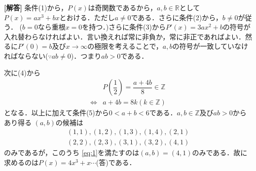\documentclass[../../main.tex]{subfiles}
\begin{document}
\begin{oframed}
  
\end{oframed}

{\bf [解答]} 条件(1)から，$P(x)$は奇関数であるから，$a,b\in\mathbb{R}$として
$P(x)=ax^3+bx$とおける．ただし$a\not=0$である．さらに条件(2)から，$b\not=0$が従う．
($b=0$なら重根$x=0$を持つ．)さらに条件(3)から$P'(x)=3ax^2+b$の符号が入れ替わらなければよい．言い換えれば常に非負か，常に非正であればよい．然るに$P'(0)=b$及び$x\to\infty$の極限を考えることで，$a,b$の符号が一致していなければならない($\because ab\not=0$)．つまり$ab>0$である．

次に(4)から
\begin{align}
  &P\left(\dfrac{1}{2}\right)=\dfrac{a+4b}{8}\in\mathbb{Z} \nonumber\\
  \Longleftrightarrow&a+4b=8k(k\in\mathbb{Z})\label{eq:1}
\end{align}
となる．以上に加えて条件(5)から$0<a+b<6$である．$a,b\in\mathbb{Z}$及び$ab>0$からあり得る
$(a,b)$の候補は
\begin{align}
  (1,1),(1,2),(1,3),(1,4),(2,1)  \\
  (2,2),(2,3),(3,1),(3,2),(4,1)
\end{align}
のみであるが，このうち
\cref{eq:1}を満たすのは$(a,b)=(4,1)$のみである．故に求めるのは$P(x)=4x^3+x\cdots$(答)である．
\newpage
\end{document}
